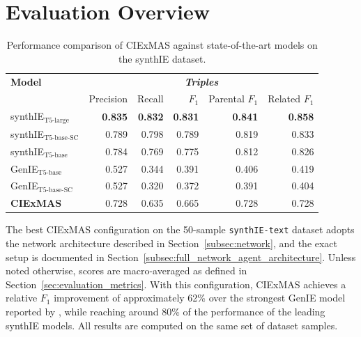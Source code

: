 \documentclass[a4paper,oneside,bibliography=totoc]{scrbook}
\begin{document}
\section{Evaluation Overview}
\label{sec:evaluation_overview}

\begin{table}[h]
  \centering
  \begin{tabular}{l|rrrrr}
    \toprule
    \textbf{Model}                & \multicolumn{5}{c}{\textit{\textbf{Triples}}}                                                                     \\
                                  & Precision                                     & Recall         & $F_1$          & Parental $F_1$ & Related $F_1$  \\
    \midrule
    synthIE$_{\text{T5-large}}$   & \textbf{0.835}                                & \textbf{0.832} & \textbf{0.831} & \textbf{0.841} & \textbf{0.858} \\
    synthIE$_{\text{T5-base-SC}}$ & 0.789                                         & 0.798          & 0.789          & 0.819          & 0.833          \\
    synthIE$_{\text{T5-base}}$    & 0.784                                         & 0.769          & 0.775          & 0.812          & 0.826          \\
    GenIE$_{\text{T5-base}}$      & 0.527                                         & 0.344          & 0.391          & 0.406          & 0.419          \\
    GenIE$_{\text{T5-base-SC}}$   & 0.527                                         & 0.320          & 0.372          & 0.391          & 0.404          \\
    \midrule
    \textbf{CIExMAS}              & 0.728                                         & 0.635          & 0.665          & 0.728          & 0.728          \\
    \bottomrule
  \end{tabular}
  \caption{Performance comparison of CIExMAS against state-of-the-art models on the synthIE dataset.}
  \label{tab:evaluation_overview}
\end{table}

The best CIExMAS configuration on the 50-sample \texttt{synthIE-text} dataset adopts the network architecture described in Section~\ref{subsec:network}, and the exact setup is documented in Section~\ref{subsec:full_network_agent_architecture}. Unless noted otherwise, scores are macro-averaged as defined in Section~\ref{sec:evaluation_metrics}. With this configuration, CIExMAS achieves a relative $F_1$ improvement of approximately 62\% over the strongest GenIE model reported by \citet{Josifoski2021}, while reaching around 80\% of the performance of the leading synthIE models. All results are computed on the same set of dataset samples.
\end{document}
